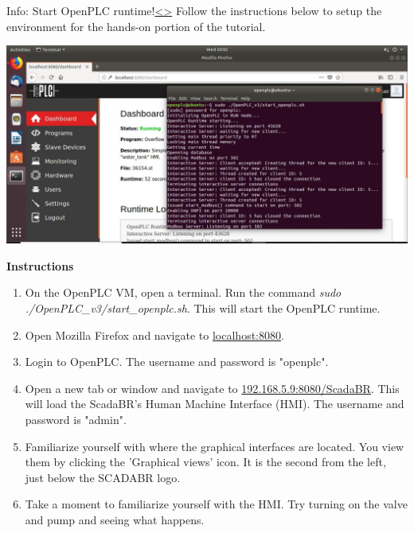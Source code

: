 \documentclass[12pt]{extarticle}
\newenvironment{instructionblock}{\Large\bgroup}{\egroup}
\newcommand{\ben}{\begin{enumerate}}
\newcommand{\een}{\end{enumerate}}
\newcounter{next}
\newcounter{prev}
\begin{document}
\pagebreak
{}
\begin{slide}{Info: Start OpenPLC runtime!}{\hyperref[slide \theprev]{\textless}\hyperref[slide \thenext]{\textgreater}}
	\begin{instructionblock}
Follow the instructions below to setup the environment for the hands-on portion of the tutorial.
\begin{center}
	\includegraphics[scale=0.36]{figures/OpenPLCRuntime01.JPG}
\end{center}
	\end{instructionblock}
\end{slide}
\vfill
\noindent
\textbf{Instructions}\\
	\ben
\item On the OpenPLC VM, open a terminal. Run the command \textit{sudo ./OpenPLC\_v3/start\_openplc.sh}. This will start the OpenPLC runtime.
\item Open Mozilla Firefox and navigate to \url{localhost:8080}. 
\item Login to OpenPLC. The username and password is "openplc".
\item Open a new tab or window and navigate to \url{192.168.5.9:8080/ScadaBR}. This will load the ScadaBR's Human Machine Interface (HMI). The username and password is "admin".
\item Familiarize yourself with where the graphical interfaces are located. You view them by clicking the 'Graphical views' icon. It is the second from the left, just below the SCADABR logo.
\item Take a moment to familiarize yourself with the HMI. Try turning on the valve and pump and seeing what happens.
\een
\end{document}
